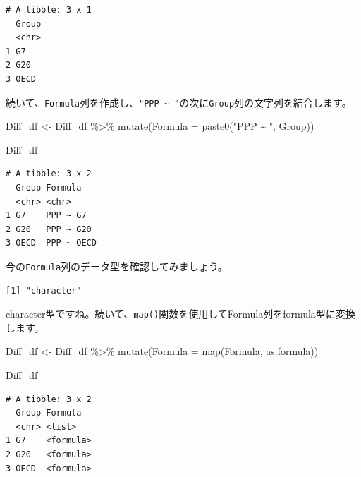 \documentclass[
  a4paper,
  pandoc,
  ja=standard,
  jafont=haranoaji]{bxjsbook}
\newenvironment{Shaded}{\begin{snugshade}}{\end{snugshade}}
\newcommand{\AttributeTok}[1]{\textcolor[rgb]{0.00,0.48,0.65}{#1}}
\newcommand{\DecValTok}[1]{\textcolor[rgb]{0.68,0.00,0.00}{#1}}
\newcommand{\FunctionTok}[1]{\textcolor[rgb]{0.28,0.35,0.67}{#1}}
\newcommand{\NormalTok}[1]{\textcolor[rgb]{0.00,0.48,0.65}{#1}}
\newcommand{\OtherTok}[1]{\textcolor[rgb]{0.00,0.48,0.65}{#1}}
\newcommand{\SpecialCharTok}[1]{\textcolor[rgb]{0.37,0.37,0.37}{#1}}
\newcommand{\StringTok}[1]{\textcolor[rgb]{0.13,0.47,0.30}{#1}}
\begin{document}
\begin{verbatim}
# A tibble: 3 x 1
  Group
  <chr>
1 G7   
2 G20  
3 OECD 
\end{verbatim}

続いて、\texttt{Formula}列を作成し、\texttt{"PPP\ \textasciitilde{}\ "}の次に\texttt{Group}列の文字列を結合します。

\begin{Shaded}
\begin{Highlighting}[numbers=left,,]
\NormalTok{Diff\_df }\OtherTok{\textless{}{-}}\NormalTok{ Diff\_df }\SpecialCharTok{\%\textgreater{}\%}
  \FunctionTok{mutate}\NormalTok{(}\AttributeTok{Formula =} \FunctionTok{paste0}\NormalTok{(}\StringTok{"PPP \textasciitilde{} "}\NormalTok{, Group))}

\NormalTok{Diff\_df}
\end{Highlighting}
\end{Shaded}

\begin{verbatim}
# A tibble: 3 x 2
  Group Formula   
  <chr> <chr>     
1 G7    PPP ~ G7  
2 G20   PPP ~ G20 
3 OECD  PPP ~ OECD
\end{verbatim}

今の\texttt{Formula}列のデータ型を確認してみましょう。

\begin{Shaded}
\end{Shaded}

\begin{verbatim}
[1] "character"
\end{verbatim}

character型ですね。続いて、\texttt{map()}関数を使用してFormula列をformula型に変換します。

\begin{Shaded}
\begin{Highlighting}[numbers=left,,]
\NormalTok{Diff\_df }\OtherTok{\textless{}{-}}\NormalTok{ Diff\_df }\SpecialCharTok{\%\textgreater{}\%}
  \FunctionTok{mutate}\NormalTok{(}\AttributeTok{Formula =} \FunctionTok{map}\NormalTok{(Formula, as.formula))}

\NormalTok{Diff\_df}
\end{Highlighting}
\end{Shaded}

\begin{verbatim}
# A tibble: 3 x 2
  Group Formula  
  <chr> <list>   
1 G7    <formula>
2 G20   <formula>
3 OECD  <formula>
\end{verbatim}
\end{document}
